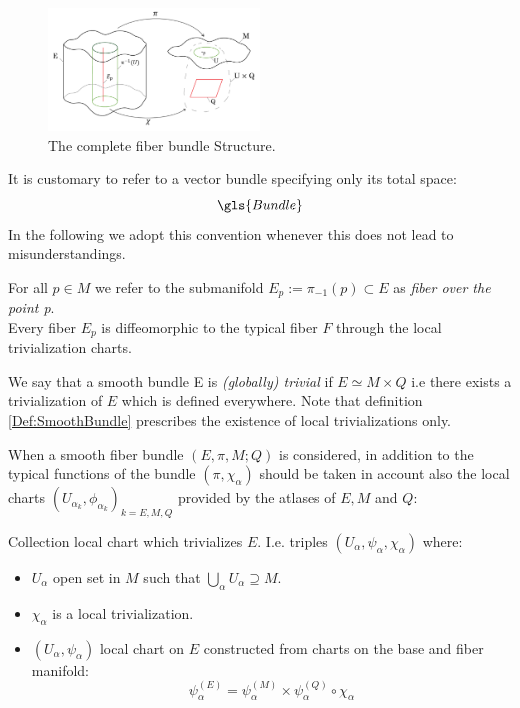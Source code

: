 \documentclass[Main]{subfiles}
\begin{document}
			\begin{figure}[h!]
  				\caption{The complete fiber bundle Structure.}
  				\includegraphics[width=0.5\textwidth]{Pictures/FiberBundle}
  				\centering
			\end{figure}
			\begin{notationfix}
				It is customary to refer to a vector bundle specifying only its total space:
				\begin{displaymath}
					\gls{Bundle}%
				\end{displaymath}
			 	In the following we adopt this convention whenever this does not lead to misunderstandings.
			\end{notationfix}
			
			\begin{observation}
				For all $p\in M$ we refer to the submanifold $E_{p} := \pi_{-1}(p) \subset E $ as \emph{fiber over the point p}.
				\\
				Every fiber $E_p$ is diffeomorphic to the typical fiber $F$ through the local trivialization charts.
			\end{observation}
			
			\begin{notationfix}
				We say that a smooth bundle E is \emph{(globally) trivial} if $E \simeq M \times Q$ i.e there exists a trivialization of $E$ which is defined everywhere.
				Note that definition \ref{Def:SmoothBundle}  prescribes the existence of local trivializations only.
			\end{notationfix}
			
			When a smooth fiber bundle $(E,\pi,M;Q)$ is considered, in addition to the typical functions of the bundle $(\pi, \chi_{\alpha})$ should be taken in account also  the local charts $(U_{\alpha_k}, \phi_{\alpha_k})_{k = E,M,Q}$ provided by the atlases of $E,M$ and $Q$:
			\begin{definition}
				Collection local chart which trivializes $E$. I.e. triples  $(U_\alpha, \psi_\alpha, \chi_\alpha)$ where:
				\begin{itemize}
					\item $U_\alpha$ open set in $M$ such that $\bigcup_{\alpha} U_{\alpha} \supseteq M$.
					\item $\chi_\alpha$  is a local trivialization.
					\item $(U_\alpha,\psi_\alpha)$ local chart on $E$ constructed from charts on the base and fiber manifold:
						\begin{displaymath}
							\psi^{(E)}_\alpha = \psi_\alpha^{(M)} \times  \psi_\alpha^{(Q)} \circ \chi_\alpha
						\end{displaymath}	
				\end{itemize}		
			\end{definition}
			
\end{document}
